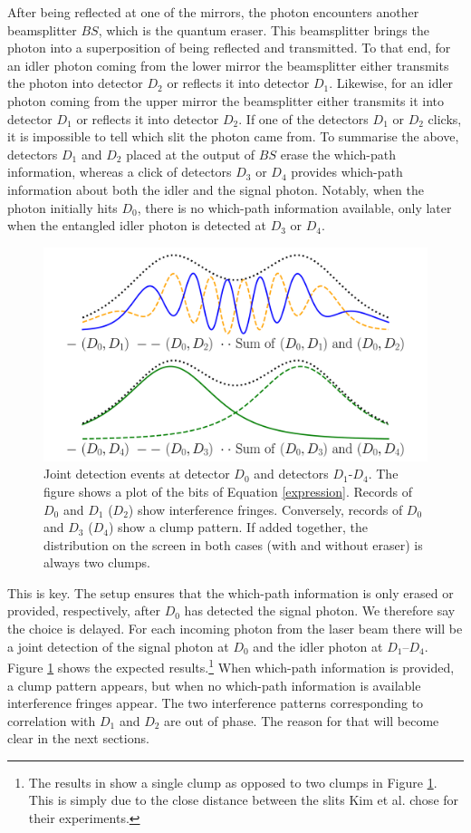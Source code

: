 \documentclass[12pt]{article}
\numberwithin{equation}{section}
\begin{document}
After being reflected at one of the mirrors, the photon encounters another beamsplitter $BS$, which is the quantum eraser. This beamsplitter brings the photon into a superposition of being reflected and transmitted. To that end, for an idler photon coming from the lower mirror the beamsplitter either transmits the photon into detector $D_2$ or reflects it into detector $D_1$. Likewise, for an idler photon coming from the upper mirror the beamsplitter either transmits it into detector $D_1$ or reflects it into detector $D_2$. If one of the detectors $D_1$ or $D_2$ clicks, it is impossible to tell which slit the photon came from. 
To summarise the above, detectors $D_1$ and $D_2$ placed at the output of $BS$ erase the which-path information, whereas a click of detectors $D_3$ or $D_4$ provides which-path information about both the idler and the signal photon. 
Notably, when the photon initially hits $D_0$, there is no which-path information available, only later when the entangled idler photon is detected at $D_3$ or $D_4$.
\begin{figure}[H]
\centering
\includegraphics[width=1\linewidth]{./inte.pdf}
\caption{Joint detection events at detector $D_0$ and detectors $D_1$-$D_4$. The figure shows a plot of the bits of Equation \ref{expression}. Records of $D_0$ and $D_1$ ($D_2$) show interference fringes. Conversely, records of $D_0$ and $D_3$ ($D_4$) show a clump pattern. If added together, the distribution on the screen in both cases (with and without eraser) is always two clumps.}
\label{fig:patterns}
\end{figure} 
This is key. The setup ensures that the which-path information is only erased or provided, respectively, after $D_0$ has detected the signal photon. We therefore say the choice is delayed.  
For each incoming photon from the laser beam there will be a joint detection of the signal photon at $D_0$ and the idler photon at $D_1$--$D_4$. Figure \ref{fig:patterns} shows the expected results.\footnote{The results in \cite{Kim1999} show a single clump as opposed to two clumps in Figure \ref{fig:patterns}. This is simply due to the close distance between the slits Kim et al. chose for their experiments.} When which-path information is provided, a clump pattern appears, but when no which-path information is available interference fringes appear. The two interference patterns corresponding to correlation with $D_1$ and $D_2$ are out of phase. The reason for that will become clear in the next sections. 
\end{document}
